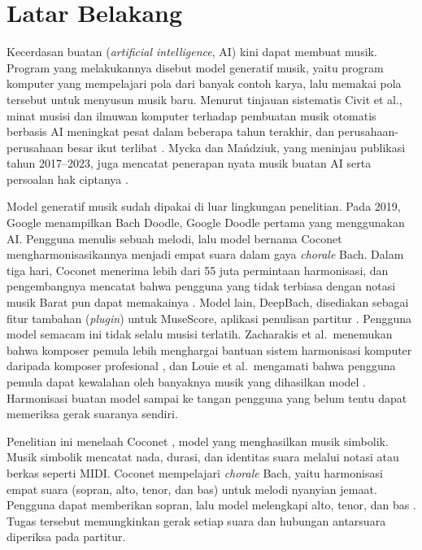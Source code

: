 
\section{Latar Belakang}\label{sec:latar-belakang}

Kecerdasan buatan (\textit{artificial intelligence}, AI) kini dapat membuat musik. Program yang melakukannya disebut model generatif musik, yaitu program komputer yang mempelajari pola dari banyak contoh karya, lalu memakai pola tersebut untuk menyusun musik baru. Menurut tinjauan sistematis Civit et al., minat musisi dan ilmuwan komputer terhadap pembuatan musik otomatis berbasis AI meningkat pesat dalam beberapa tahun terakhir, dan perusahaan-perusahaan besar ikut terlibat \parencite{civit2022}. Mycka dan Mańdziuk, yang meninjau publikasi tahun 2017--2023, juga mencatat penerapan nyata musik buatan AI serta persoalan hak ciptanya \parencite{mycka2025}.

Model generatif musik sudah dipakai di luar lingkungan penelitian. Pada 2019, Google menampilkan Bach Doodle, Google Doodle pertama yang menggunakan AI. Pengguna menulis sebuah melodi, lalu model bernama Coconet mengharmonisasikannya menjadi empat suara dalam gaya \textit{chorale} Bach. Dalam tiga hari, Coconet menerima lebih dari 55 juta permintaan harmonisasi, dan pengembangnya mencatat bahwa pengguna yang tidak terbiasa dengan notasi musik Barat pun dapat memakainya \parencite[793]{huang2019}. Model lain, DeepBach, disediakan sebagai fitur tambahan (\textit{plugin}) untuk MuseScore, aplikasi penulisan partitur \parencite[1368]{hadjeres2017}. Pengguna model semacam ini tidak selalu musisi terlatih. Zacharakis et al.\ menemukan bahwa komposer pemula lebih menghargai bantuan sistem harmonisasi komputer daripada komposer profesional \parencite{zacharakis2021}, dan Louie et al.\ mengamati bahwa pengguna pemula dapat kewalahan oleh banyaknya musik yang dihasilkan model \parencite{louie2020}. Harmonisasi buatan model sampai ke tangan pengguna yang belum tentu dapat memeriksa gerak suaranya sendiri.

Penelitian ini menelaah Coconet \parencite{huang2017}, model yang menghasilkan musik simbolik. Musik simbolik mencatat nada, durasi, dan identitas suara melalui notasi atau berkas seperti MIDI. Coconet mempelajari \textit{chorale} Bach, yaitu harmonisasi empat suara (sopran, alto, tenor, dan bas) untuk melodi nyanyian jemaat. Pengguna dapat memberikan sopran, lalu model melengkapi alto, tenor, dan bas \parencite[211--213]{huang2017}. Tugas tersebut memungkinkan gerak setiap suara dan hubungan antarsuara diperiksa pada partitur.

